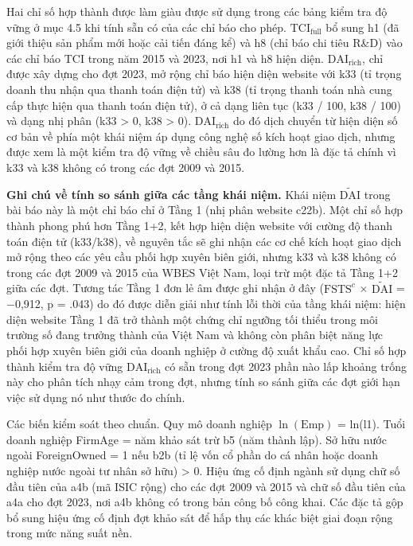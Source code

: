 \documentclass[12pt,a4paper]{article}
\begin{document}
Hai chỉ số hợp thành được làm giàu được sử dụng trong các bảng kiểm tra
độ vững ở mục 4.5 khi tính sẵn có của các chỉ báo cho phép.
\(\mathrm{TCI}_{\text{full}}\) bổ sung h1 (đã giới thiệu sản phẩm mới
hoặc cải tiến đáng kể) và h8 (chỉ báo chi tiêu R\&D) vào các chỉ báo TCI
trong năm 2015 và 2023, nơi h1 và h8 hiện diện.
\(\mathrm{DAI}_{\text{rich}}\), chỉ được xây dựng cho đợt 2023, mở rộng
chỉ báo hiện diện website với k33 (tỉ trọng doanh thu nhận qua thanh
toán điện tử) và k38 (tỉ trọng thanh toán nhà cung cấp thực hiện qua
thanh toán điện tử), ở cả dạng liên tục (k33 / 100, k38 / 100) và dạng
nhị phân (k33 \textgreater{} 0, k38 \textgreater{} 0).
\(\mathrm{DAI}_{\text{rich}}\) do đó dịch chuyển từ hiện diện số cơ bản
về phía một khái niệm áp dụng công nghệ số kích hoạt giao dịch, nhưng
được xem là một kiểm tra độ vững về chiều sâu đo lường hơn là đặc tả
chính vì k33 và k38 không có trong các đợt 2009 và 2015.

\textbf{Ghi chú về tính so sánh giữa các tầng khái niệm.} Khái niệm
\(\tilde{\mathrm{DAI}}\) trong bài báo này là một chỉ báo chỉ ở Tầng 1
(nhị phân website c22b). Một chỉ số hợp thành phong phú hơn Tầng 1+2,
kết hợp hiện diện website với cường độ thanh toán điện tử (k33/k38), về
nguyên tắc sẽ ghi nhận các cơ chế kích hoạt giao dịch mở rộng theo các
yêu cầu phối hợp xuyên biên giới, nhưng k33 và k38 không có trong các
đợt 2009 và 2015 của WBES Việt Nam, loại trừ một đặc tả Tầng 1+2 giữa
các đợt. Tương tác Tầng 1 đơn lẻ âm được ghi nhận ở đây
(\(\mathrm{FSTS}^{c}\) × \(\tilde{\mathrm{DAI}}\) = −0,912, p = .043) do
đó được diễn giải như tính lỗi thời của tầng khái niệm: hiện diện
website Tầng 1 đã trở thành một chứng chỉ ngưỡng tối thiểu trong môi
trường số đang trưởng thành của Việt Nam và không còn phân biệt năng lực
phối hợp xuyên biên giới của doanh nghiệp ở cường độ xuất khẩu cao. Chỉ
số hợp thành kiểm tra độ vững \(\mathrm{DAI}_{\text{rich}}\) có sẵn
trong đợt 2023 phần nào lấp khoảng trống này cho phân tích nhạy cảm
trong đợt, nhưng tính so sánh giữa các đợt giới hạn việc sử dụng nó như
thước đo chính.

Các biến kiểm soát theo chuẩn. Quy mô doanh nghiệp \(\ln(\mathrm{Emp})\)
= ln(l1). Tuổi doanh nghiệp FirmAge = năm khảo sát trừ b5 (năm thành
lập). Sở hữu nước ngoài ForeignOwned = 1 nếu b2b (tỉ lệ vốn cổ phần do
cá nhân hoặc doanh nghiệp nước ngoài tư nhân sở hữu) \textgreater{} 0.
Hiệu ứng cố định ngành sử dụng chữ số đầu tiên của a4b (mã ISIC rộng)
cho các đợt 2009 và 2015 và chữ số đầu tiên của a4a cho đợt 2023, nơi
a4b không có trong bản công bố công khai. Các đặc tả gộp bổ sung hiệu
ứng cố định đợt khảo sát để hấp thụ các khác biệt giai đoạn rộng trong
mức năng suất nền.
\end{document}
